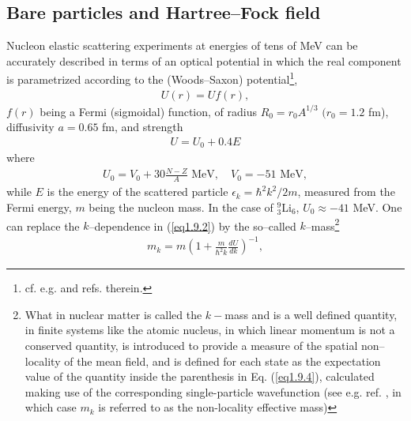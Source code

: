 \subsection{Bare particles and Hartree--Fock field}\label{S1.9.1}
Nucleon elastic scattering experiments at energies of tens of MeV can be accurately described in terms of an optical potential in which the real component is parametrized according to the (Woods--Saxon) potential\footnote{cf. e.g. \cite{Bohr:69} and refs. therein.},
\begin{align}
U(r)=Uf(r),
\end{align}
$f(r)$ being a Fermi (sigmoidal) function, of radius $R_0=r_0A^{1/3}$ $(r_0=1.2$ fm), diffusivity $a=0.65$ fm, and strength 
\begin{align}\label{eq1.9.2}
U=U_0+0.4 E
\end{align}
where 
\begin{align}\label{eq1.9.3}
U_0=V_0+30\frac{N-Z}{A}\text{ MeV},\quad V_0=-51\text{ MeV},
\end{align}
while $E$ is the energy of the scattered particle $\epsilon_k=\hbar^2k^2/2m$, measured from the Fermi energy, $m$ being the nucleon mass. In the case of $^{9 }_3$Li$_6$, $U_0\approx-41$ MeV. One can replace the $k$--dependence in (\ref{eq1.9.2}) by the so--called $k$--mass\footnote{What in nuclear matter is called the $k-$mass  and is a well defined quantity, in finite systems like the atomic nucleus, in which linear momentum is not
a conserved quantity,  is introduced to provide a measure of the spatial non--locality of the mean field, and is defined for each state 
as the expectation value of the quantity inside the parenthesis in Eq. (\ref{eq1.9.4}), calculated making use of the corresponding single-particle wavefunction 
(see e.g. ref. \cite{Bernard:81}, in which case $m_k$ is referred to as the non-locality effective mass)}
\begin{align}\label{eq1.9.4}
m_k=m\left(1+\frac{m}{\hbar^2k}\frac{dU}{dk}\right)^{-1},
\end{align}
